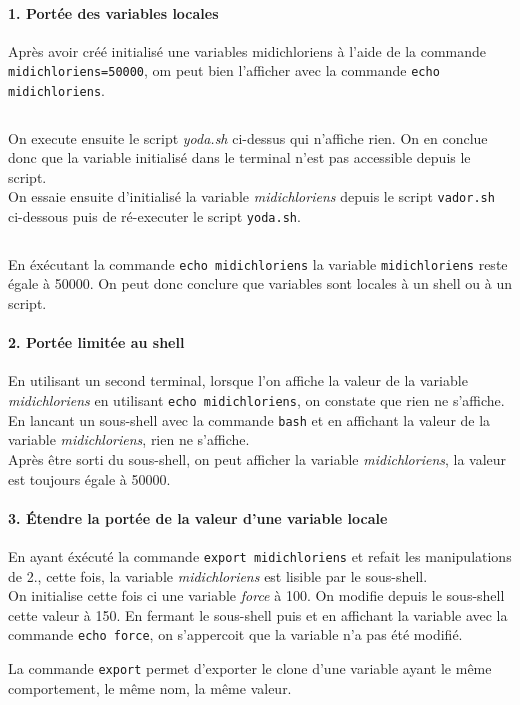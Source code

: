 \paragraph{1. Portée des variables locales}
Après avoir créé initialisé une variables midichloriens à l'aide de la commande \texttt{midichloriens=50000}, om peut bien l'afficher avec la commande \texttt{echo midichloriens}.
\inputminted{bash}{../sources/shell/TP1-2/ex7-yoda.sh}
On execute ensuite le script \textit{yoda.sh} ci-dessus qui n'affiche rien. On en conclue donc que la variable initialisé dans le terminal n'est pas accessible depuis le script.\\
On essaie ensuite d'initialisé la variable \textit{midichloriens} depuis le script \texttt{vador.sh} ci-dessous puis de ré-executer le script \texttt{yoda.sh}.
\inputminted{bash}{../sources/shell/TP1-2/ex7-vador.sh}
En éxécutant la commande \texttt{echo midichloriens} la variable \texttt{midichloriens} reste égale à 50000. On peut donc conclure que variables sont locales à un shell ou à un script.

\paragraph{2. Portée limitée au shell}
En utilisant un second terminal, lorsque l’on affiche la valeur de la variable \textit{midichloriens} en utilisant \texttt{echo midichloriens}, on constate que rien ne s’affiche.\\
En lancant un sous-shell avec la commande \texttt{bash} et en affichant la valeur de la variable \textit{midichloriens}, rien ne s’affiche.\\
Après être sorti du sous-shell, on peut afficher la variable \textit{midichloriens}, la valeur est toujours égale à 50000.

\paragraph{3. Étendre la portée de la valeur d’une variable locale}
En ayant éxécuté la commande \texttt{export midichloriens} et refait les manipulations de {2.}, cette fois, la variable \textit{midichloriens} est lisible par le sous-shell.\\
On initialise cette fois ci une variable \textit{force} à 100. On modifie depuis le sous-shell cette valeur à 150. En fermant le sous-shell puis et en affichant la variable avec la commande \texttt{echo force}, on s'appercoit que la variable n'a pas été modifié. \par
La commande \texttt{export} permet d'exporter le clone d'une variable ayant le même comportement, le même nom, la même valeur.
